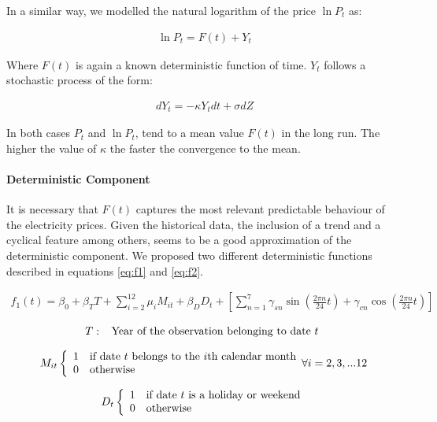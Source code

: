 \documentclass[3p]{elsarticle}
\begin{document}
In a similar way, we modelled the natural logarithm of the price $\ln P_t$ as:

\begin{align}
\label{eq:slnP}
\ln P_t=F(t)+Y_t
\end{align}

Where $F(t)$ is again a known deterministic function of time. $Y_t$ follows a stochastic process of the form:

\begin{align}
\label{eq:sY}
dY_t=-\kappa Y_tdt+\sigma dZ
\end{align}

In both cases $P_t$ and $\ln P_t$, tend to a mean value $F(t)$ in the long run. The higher the value of $\kappa$ the faster the convergence to the mean.

\paragraph{Deterministic Component}
It is necessary that $F(t)$ captures the most relevant predictable behaviour of the electricity prices. Given the historical data, the inclusion of a trend and a cyclical feature among others, seems to be a good approximation of the deterministic  component. We proposed two different deterministic functions described in equations \ref{eq:f1} and \ref{eq:f2}. 

\begin{align}
\label{eq:f1}
f_1(t)=\beta_0+\beta_T T+\sum_{i=2}^{12}\mu_iM_{it}+\beta_DD_t+\left [ \sum_{n=1}^{7} \gamma_{sn}\sin\left ( \frac{2\pi n}{24}t \right )+\gamma_{cn}\cos\left ( \frac{2\pi n}{24}t \right )\right ]
\end{align}

\[T:\
\begin{array}{ll}
 \textup{Year of the observation belonging to date } t 
\end{array}\] 

\[M_{it}\left\{
\begin{array}{ll}
      1 & \textup{if date } t \textup{ belongs to the } i \textup{th calendar month} \\
      0 & \textup{otherwise} \\
\end{array}
\forall i =2,3,...12
\right. \]  

\[D_t\left\{
\begin{array}{ll}
      1 & \textup{if date } t \textup{ is a holiday or weekend} \\
      0 & \textup{otherwise} \\
\end{array} 
\right. \]
\end{document}
